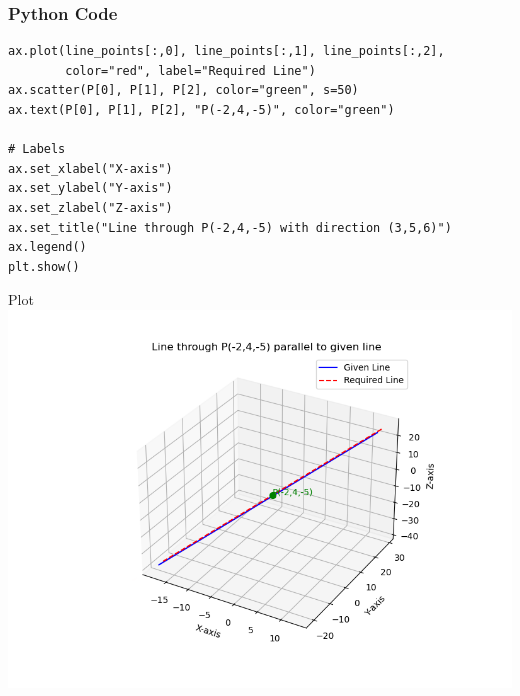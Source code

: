 \documentclass{beamer}
\begin{document}
\begin{frame}[fragile]
    \frametitle{Python Code}
    \begin{lstlisting}
ax.plot(line_points[:,0], line_points[:,1], line_points[:,2], 
        color="red", label="Required Line")
ax.scatter(P[0], P[1], P[2], color="green", s=50)
ax.text(P[0], P[1], P[2], "P(-2,4,-5)", color="green")

# Labels
ax.set_xlabel("X-axis")
ax.set_ylabel("Y-axis")
ax.set_zlabel("Z-axis")
ax.set_title("Line through P(-2,4,-5) with direction (3,5,6)")
ax.legend()
plt.show()
    \end{lstlisting}
\end{frame}

\begin{frame}{Plot}
    \centering
    \includegraphics[width=\columnwidth, height=0.8\textheight, keepaspectratio]{Figs/Fig1.png}     
\end{frame}
\end{document}
